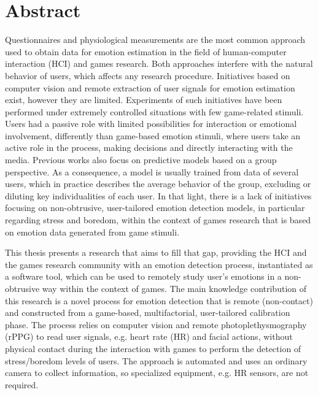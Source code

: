 \chapter*{Abstract}

Questionnaires and physiological measurements are the most common approach used to obtain data for emotion estimation in the field of human-computer interaction (HCI) and games research. Both approaches interfere with the natural behavior of users, which affects any research procedure. Initiatives based on computer vision and remote extraction of user signals for emotion estimation exist, however they are limited. Experiments of such initiatives have been performed under extremely controlled situations with few game-related stimuli. Users had a passive role with limited possibilities for interaction or emotional involvement, differently than game-based emotion stimuli, where users take an active role in the process, making decisions and directly interacting with the media. Previous works also focus on predictive models based on a group perspective. As a consequence, a model is usually trained from data of several users, which in practice describes the average behavior of the group, excluding or diluting key individualities of each user. In that light, there is a lack of initiatives focusing on non-obtrusive, user-tailored emotion detection models, in particular regarding stress and boredom, within the context of games research that is based on emotion data generated from game stimuli.

This thesis presents a research that aims to fill that gap, providing the HCI and the games research community with an emotion detection process, instantiated as a software tool, which can be used to remotely study user's emotions in a non-obtrusive way within the context of games. The main knowledge contribution of this research is a novel process for emotion detection that is remote (non-contact) and constructed from a game-based, multifactorial, user-tailored calibration phase. The process relies on computer vision and remote photoplethysmography (rPPG) to read user signals, e.g. heart rate (HR) and facial actions, without physical contact during the interaction with games to perform the detection of stress/boredom levels of users. The approach is automated and uses an ordinary camera to collect information, so specialized equipment, e.g. HR sensors, are not required.

